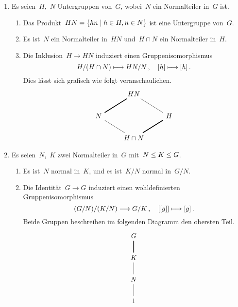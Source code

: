 \begin{corollary}
  \leavevmode
  \begin{enumerate}
    \item
      Es seien~$H$,~$N$ Untergruppen von~$G$, wobei~$N$ ein Normalteiler in~$G$ ist.
      \begin{enumerate}
        \item
          Das Produkt~$HN = \{ hn \suchthat h \in H, n \in N \}$ ist eine Untergruppe von~$G$.
        \item
          Es ist~$N$ ein Normalteiler in~$HN$ und~$H \cap N$ ein Normalteiler in~$H$.
        \item
          Die Inklusion~$H \to HN$ induziert einen Gruppenisomorphismus
          \[
            H / (H \cap N)
            \mapsto
            HN / N \,,
            \quad
            \class{h}
            \mapsto
            \class{h} \,.
          \]
          Dies lässt sich grafisch wie folgt veranschaulichen.
          \[
            \begin{tikzcd}
              {}
              &
              HN
              &
              {}
              \\
              N
              \arrow[very thick, dash]{ur}
              &
              {}
              &
              H
              \arrow[dash]{ul}
              \\
              {}
              &
              H \cap N
              \arrow[dash]{ul}
              \arrow[very thick, dash]{ur}
              &
              {}
            \end{tikzcd}
          \]
      \end{enumerate}
    \item
      Es seien~$N$,~$K$ zwei Normalteiler in~$G$ mit~$N \leq K \leq G$.
      \begin{enumerate}
        \item
          Es ist~$N$ normal in~$K$, und es ist~$K/N$ normal in~$G/N$.
        \item
          Die Identität~$G \to G$ induziert einen wohldefinierten Gruppenisomorphismus
          \[
            (G/N) / (K/N)
            \to
            G / K \,,
            \quad
            \class{ \class{g} }
            \mapsto
            \class{g} \,.
          \]
          Beide Gruppen beschreiben im folgenden Diagramm den obersten Teil.
          \[
            \begin{tikzcd}
              G
              \\
              K
              \arrow[very thick, dash]{u}
              \\
              N
              \arrow[dash]{u}
              \\
              1
              \arrow[dash]{u}
            \end{tikzcd}
          \]
      \end{enumerate}
  \end{enumerate}
\end{corollary}





